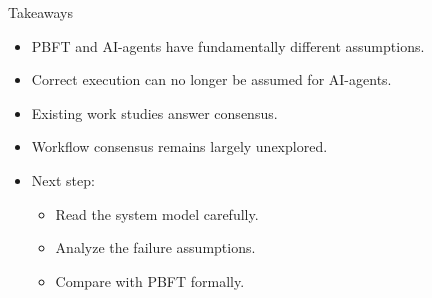 \documentclass{beamer}
\begin{document}
\begin{frame}{Takeaways}

\begin{itemize}
    \item PBFT and AI-agents have fundamentally different assumptions.
    \item Correct execution can no longer be assumed for AI-agents.
    \item Existing work studies answer consensus.
    \item Workflow consensus remains largely unexplored.
    \item Next step:
    \begin{itemize}
        \item Read the system model carefully.
        \item Analyze the failure assumptions.
        \item Compare with PBFT formally.
    \end{itemize}
\end{itemize}

\end{frame}
\end{document}
